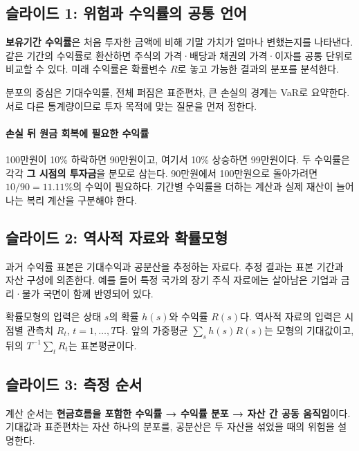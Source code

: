 \documentclass[11pt,a4paper]{article}
\begin{document}
\subsection{슬라이드 1: 위험과 수익률의 공통 언어}

\textbf{보유기간 수익률}은 처음 투자한 금액에 비해 기말 가치가 얼마나 변했는지를 나타낸다. 같은 기간의 수익률로 환산하면 주식의 가격·배당과 채권의 가격·이자를 공통 단위로 비교할 수 있다. 미래 수익률은 확률변수 $R$로 놓고 가능한 결과의 분포를 분석한다.
\par

분포의 중심은 기대수익률, 전체 퍼짐은 표준편차, 큰 손실의 경계는 VaR로 요약한다. 서로 다른 통계량이므로 투자 목적에 맞는 질문을 먼저 정한다.
\par

\paragraph{손실 뒤 원금 회복에 필요한 수익률}

100만원이 10\% 하락하면 90만원이고, 여기서 10\% 상승하면 99만원이다. 두 수익률은 각각 \textbf{그 시점의 투자금}을 분모로 삼는다. 90만원에서 100만원으로 돌아가려면 $10/90=11.11\%$의 수익이 필요하다. 기간별 수익률을 더하는 계산과 실제 재산이 늘어나는 복리 계산을 구분해야 한다.
\par

\subsection{슬라이드 2: 역사적 자료와 확률모형}

과거 수익률 표본은 기대수익과 공분산을 추정하는 자료다. 추정 결과는 표본 기간과 자산 구성에 의존한다. 예를 들어 특정 국가의 장기 주식 자료에는 살아남은 기업과 금리·물가 국면이 함께 반영되어 있다.
\par

확률모형의 입력은 상태 $s$의 확률 $h(s)$와 수익률 $R(s)$다. 역사적 자료의 입력은 시점별 관측치 $R_t$, $t=1,\ldots,T$다. 앞의 가중평균 $\sum_sh(s)R(s)$는 모형의 기대값이고, 뒤의 $T^{-1}\sum_tR_t$는 표본평균이다.
\par

\subsection{슬라이드 3: 측정 순서}

계산 순서는 \textbf{현금흐름을 포함한 수익률 → 수익률 분포 → 자산 간 공동 움직임}이다. 기대값과 표준편차는 자산 하나의 분포를, 공분산은 두 자산을 섞었을 때의 위험을 설명한다.
\par
\end{document}
